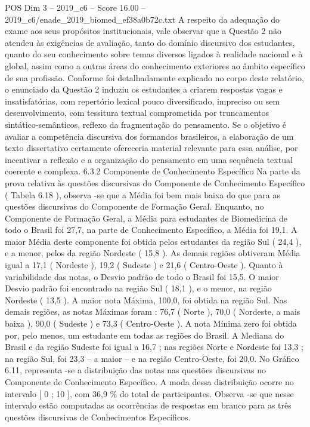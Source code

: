 \begin{textsample}{POS Dim 3 – 2019\_c6 – Score 16.00 – 2019\_c6/enade\_2019\_biomed\_ef38a0b72c.txt}
A respeito da adequação do exame aos seus propósitos institucionais, vale observar que a Questão 2 não atendeu às exigências de avaliação, tanto do domínio discursivo dos estudantes, quanto do seu conhecimento sobre temas diversos ligados à realidade nacional e à global, assim como a outras áreas do conhecimento exteriores ao âmbito específico de sua profissão.
Conforme foi detalhadamente explicado no corpo deste relatório, o enunciado da Questão 2 induziu os estudantes a criarem respostas vagas e insatisfatórias, com repertório lexical pouco diversificado, impreciso ou sem desenvolvimento, com tessitura textual comprometida por truncamentos sintático-semânticos, reflexo da fragmentação do pensamento.
Se o objetivo é avaliar a competência discursiva dos formandos brasileiros, a elaboração de um texto dissertativo certamente ofereceria material relevante para essa análise, por incentivar a reflexão e a organização do pensamento em uma sequência textual coerente e complexa. 6.3.2 Componente de Conhecimento Específico Na parte da prova relativa às questões discursivas do Componente de Conhecimento Específico ( Tabela 6.18 ), observa -se que a Média foi bem mais baixa do que para as questões discursivas do Componente de Formação Geral.
Enquanto, no Componente de Formação Geral, a Média para estudantes de Biomedicina de todo o Brasil foi 27,7, na parte de Conhecimento Específico, a Média foi 19,1.
A maior Média deste componente foi obtida pelos estudantes da região Sul ( 24,4 ), e a menor, pelos da região Nordeste ( 15,8 ).
As demais regiões obtiveram Média igual a 17,1 ( Nordeste ), 19,2 ( Sudeste ) e 21,6 ( Centro-Oeste ).
Quanto à variabilidade das notas, o Desvio padrão de todo o Brasil foi 15,5.
O maior Desvio padrão foi encontrado na região Sul ( 18,1 ), e o menor, na região Nordeste ( 13,5 ).
A maior nota Máxima, 100,0, foi obtida na região Sul.
Nas demais regiões, as notas Máximas foram : 76,7 ( Norte ), 70,0 ( Nordeste, a mais baixa ), 90,0 ( Sudeste ) e 73,3 ( Centro-Oeste ).
A nota Mínima zero foi obtida por, pelo menos, um estudante em todas as regiões do Brasil.
A Mediana do Brasil e da região Sudeste foi igual a 16,7 ; nas regiões Norte e Nordeste foi 13,3 ; na região Sul, foi 23,3 – a maior – e na região Centro-Oeste, foi 20,0.
No Gráfico 6.11, representa -se a distribuição das notas nas questões discursivas no Componente de Conhecimento Específico.
A moda dessa distribuição ocorre no intervalo [ 0 ; 10 ], com 36,9 \% do total de participantes.
Observa -se que nesse intervalo estão computadas as ocorrências de respostas em branco para as três questões discursivas de Conhecimentos Específicos.

\end{textsample}
